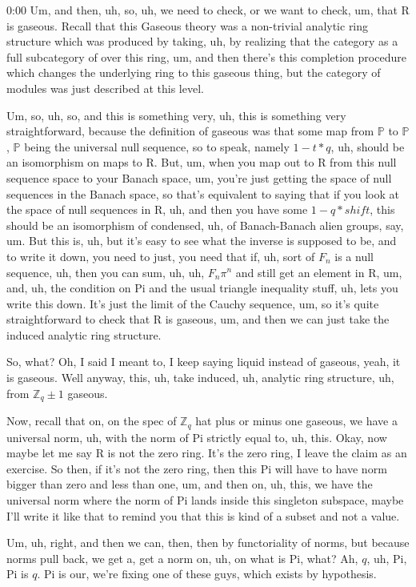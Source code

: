 \begin{unfinished}{0:00}
Um, and then, uh, so, uh, we need to check, or we want to check, um, that R is gaseous. Recall that this Gaseous theory was a non-trivial analytic ring structure which was produced by taking, uh, by realizing that the category as a full subcategory of over this ring, um, and then there's this completion procedure which changes the underlying ring to this gaseous thing, but the category of modules was just described at this level.

Um, so, uh, so, and this is something very, uh, this is something very straightforward, because the definition of gaseous was that some map from $\mathbb{P}$ to $\mathbb{P}$, $\mathbb{P}$ being the universal null sequence, so to speak, namely $1 - t * q$, uh, should be an isomorphism on maps to R. But, um, when you map out to R from this null sequence space to your Banach space, um, you're just getting the space of null sequences in the Banach space, so that's equivalent to saying that if you look at the space of null sequences in R, uh, and then you have some $1 - q * shift$, this should be an isomorphism of condensed, uh, of Banach-Banach alien groups, say, um. But this is, uh, but it's easy to see what the inverse is supposed to be, and to write it down, you need to just, you need that if, uh, sort of $F_n$ is a null sequence, uh, then you can sum, uh, uh, $F_n \pi^n$ and still get an element in R, um, and, uh, the condition on Pi and the usual triangle inequality stuff, uh, lets you write this down. It's just the limit of the Cauchy sequence, um, so it's quite straightforward to check that R is gaseous, um, and then we can just take the induced analytic ring structure.

So, what? Oh, I said I meant to, I keep saying liquid instead of gaseous, yeah, it is gaseous. Well anyway, this, uh, take induced, uh, analytic ring structure, uh, from $\mathbb{Z}_q \pm 1$ gaseous.

Now, recall that on, on the spec of $\mathbb{Z}_q$ hat plus or minus one gaseous, we have a universal norm, uh, with the norm of Pi strictly equal to, uh, this. Okay, now maybe let me say R is not the zero ring. It's the zero ring, I leave the claim as an exercise. So then, if it's not the zero ring, then this Pi will have to have norm bigger than zero and less than one, um, and then on, uh, this, we have the universal norm where the norm of Pi lands inside this singleton subspace, maybe I'll write it like that to remind you that this is kind of a subset and not a value.

Um, uh, right, and then we can, then, then by functoriality of norms, but because norms pull back, we get a, get a norm on, uh, on what is Pi, what? Ah, $q$, uh, Pi, Pi is $q$. Pi is our, we're fixing one of these guys, which exists by hypothesis.


\end{unfinished}
